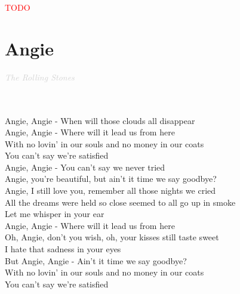\documentclass[a5paper, 10pt]{book}
\begin{document}
\begin{minipage}[t]{0.2\textwidth}
\textcolor{red}{TODO}\\
\end{minipage}

\newpage
\section{Angie }\textcolor{lightgray}{\textit{The Rolling Stones}}\\~\\
\begin{minipage}[t]{0.8\textwidth}
~ \\
Angie, Angie - When will those clouds all disappear\\
Angie, Angie - Where will it lead us from here\\

\hspace*{2mm} With no lovin' in our souls and no money in our coats\\
\hspace*{2mm} You can't say we're satisfied\\

Angie, Angie - You can't say we never tried\\

Angie, you're beautiful, but ain't it time we say goodbye?\\
Angie, I still love you, remember all those nights we cried\\

\hspace*{2mm} All the dreams were held so close seemed to all go up in smoke\\
\hspace*{2mm} Let me whisper in your ear\\

Angie, Angie - Where will it lead us from here\\

\hspace*{2mm} Oh, Angie, don't you wish, oh, your kisses still taste sweet\\
\hspace*{2mm} I hate that sadness in your eyes\\

But Angie, Angie - Ain't it time we say goodbye?\\

\hspace*{2mm} With no lovin' in our souls and no money in our coats\\
\hspace*{2mm} You can't say we're satisfied\\


\end{minipage}
\end{document}
